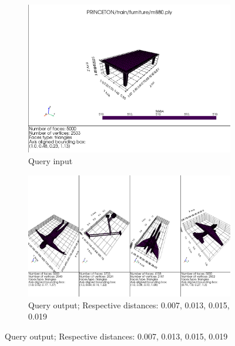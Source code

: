 \begin{figure}[H]
    \begin{subfigure}[b]{0.3\textwidth}
        \includegraphics[width=\textwidth]{assets/queries/furniture/input.png}
        \caption{Query input}
        \label{fig:query-input-ann-2}
    \end{subfigure}
    \hfill
    \begin{subfigure}[b]{0.65\textwidth}
        \includegraphics[width=\textwidth]{assets/queries/furniture_ann/output.png}
        \caption{Query output; Respective distances: 0.007, 0.013, 0.015, 0.019}
        \label{fig:query-output-ann-2}
    \end{subfigure}
    \hfill
    

\end{figure}
